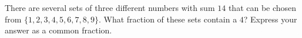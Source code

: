 There are several sets of three different numbers with sum $14$ that can be chosen from $\{1,2,3,4,5,6,7,8,9\}$. What fraction of these sets contain a $4$? Express your answer as a common fraction.
